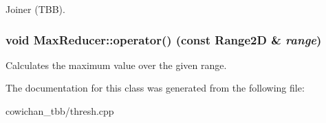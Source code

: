 Joiner (TBB). \hypertarget{class_max_reducer_80d53943773b8909921c53a2f094d078}{
\subsubsection[{operator()}]{\setlength{\rightskip}{0pt plus 5cm}void MaxReducer::operator() (const {\bf Range2D} \& {\em range})}}
\label{class_max_reducer_80d53943773b8909921c53a2f094d078}


Calculates the maximum value over the given range. 

The documentation for this class was generated from the following file:\begin{CompactItemize}
\item 
cowichan\_\-tbb/thresh.cpp\end{CompactItemize}
